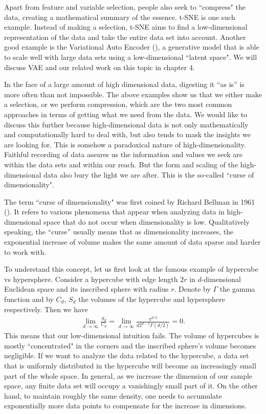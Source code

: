 Apart from feature and variable selection, people also seek to ``compress" the
data, creating a mathematical summary of the essence. t-SNE is one such
example. Instead of making a selection, t-SNE aims to find a low-dimensional
representation of the data and take the entire data set into account. Another
good example is the Variational Auto Encoder (\cite{kingma2013auto}), a
generative model that is able to scale well with large data sets using a
low-dimensional ``latent space". We will discuss VAE and our related work on
this topic in chapter 4.

In the face of a large amount of high dimensional data, digesting it ``as is'' is
more often than not impossible. The above examples show us that we either make
a selection, or we perform compression, which are the two most common
approaches in terms of getting what we need from the data. We would like to
discuss this further because high-dimensional data is not only mathematically
and computationally hard to deal with, but also tends to mask the insights we
are looking for. This is somehow a paradoxical nature of high-dimensionality.
Faithful recording of data assures us the information and values we seek are
within the data sets and within our reach. But the form and scaling of the
high-dimensional data also bury the light we are after. This is the so-called
``curse of dimensionality".

The term ``curse of dimensionality" was first coined by Richard Bellman in 1961
(\cite{Bellman1961adaptive}). It refers to various phenomena that appear when
analyzing data in high-dimensional space that do not occur when dimensionality
is low. Qualitatively speaking, the ``curse'' usually means that as
dimensionality increases, the exponential increase of volume makes the same
amount of data sparse and harder to work with.

To understand this concept, let us first look at the famous example of
hypercube vs hypersphere. Consider a hypercube with edge length $2r$ in
$d$-dimensional Euclidean space and its inscribed sphere with radius $r$.
Denote by $\Gamma$ the gamma function and by $C_d$, $S_d$ the volumes of the hypercube
and hypersphere respectively. Then we have
\begin{align}
    \lim_{d \to \infty} \frac{S_d}{C_d} = \lim_{d \to \infty} \frac{\pi^{d/2}}{d2^{d-1}\Gamma(d/2)} = 0.
\end{align}
This means that our low-dimensional intuition fails. The volume of hypercubes is mostly ``concentrated" in the corners and the inscribed sphere's volume becomes negligible. If we want to analyze the data related to the hypercube, a data set that is uniformly distributed in the hypercube will become an increasingly small part of the whole space. In general, as we increase the dimension of our sample space, any finite data set will occupy a vanishingly small part of it. On the other hand, to maintain roughly the same density, one needs to accumulate exponentially more data points to compensate for the increase in dimensions.

